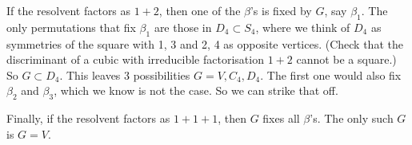 \documentclass[12pt]{amsart}
\begin{document}
If the resolvent factors as \(1+2\), then one of the \(\beta\)'s is fixed by \(G\), say \(\beta_1\).
The only permutations that fix \(\beta_1\) are those in \(D_4 \subset S_4\), where we think of \(D_4\) as symmetries of the square with 1, 3 and 2, 4 as opposite vertices.
(Check that the discriminant of a cubic with irreducible factorisation \(1+2\) cannot be a square.)
So \(G \subset D_4\). 
This leaves 3 possibilities \(G = V, C_4, D_4\).
The first one would also fix \(\beta_2\) and \(\beta_3\), which we know is not the case.
So we can strike that off.

Finally, if the resolvent factors as \(1+1+1\), then \(G\) fixes all \(\beta\)'s.
The only such \(G\) is \(G = V\).
\end{document}
